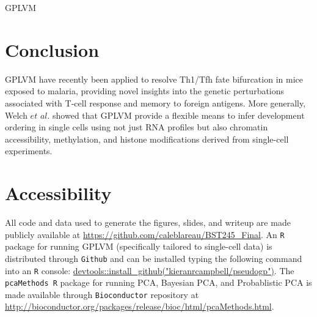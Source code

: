 \documentclass[english, 11pt]{article}\usepackage[]{graphicx}\usepackage[]{color}
\begin{document}
GPLVM \cite{lawrence2004gaussian}




\section{Conclusion}

GPLVM have recently been applied to resolve Th1/Tfh fate bifurcation in mice exposed to malaria, providing novel insights into the genetic perturbations associated with T-cell response and memory to foreign antigens. \cite{lonnberg2017single} More generally, Welch $et$ $al.$ showed that GPLVM provide a flexible means to infer development ordering in single cells using not just RNA profiles but also chromatin accessibility, methylation, and histone modifications derived from single-cell experiments. \cite{welch2017manifold}

\section*{Accessibility}

All code and data used to generate the figures, slides, and writeup are made publicly available at \url{https://github.com/caleblareau/BST245_Final}. An \texttt{R} package for running GPLVM (specifically tailored to single-cell data) is distributed through \texttt{Github} and can be installed typing the following command into an \texttt{R} console: \url{devtools::install_github("kieranrcampbell/pseudogp")}.  The \texttt{pcaMethods R} package for running PCA, Bayesian PCA, and Probablistic PCA is made available through \texttt{Bioconductor} repository at \url{http://bioconductor.org/packages/release/bioc/html/pcaMethods.html}.

\newpage{}



{}
\end{document}

